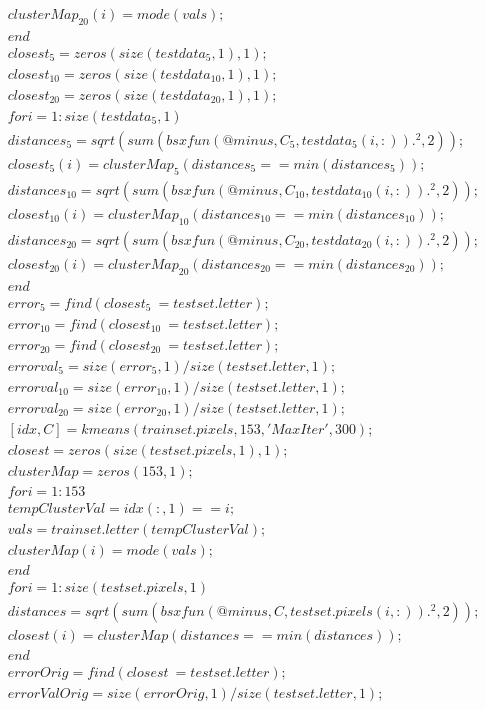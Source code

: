\begin{enumerate}
\begin{align*}
    clusterMap_{20}(i) = mode(vals);\\
end\\
closest_5 = zeros(size(testdata_5,1),1); \\
closest_{10} = zeros(size(testdata_{10},1),1); \\
closest_{20} = zeros(size(testdata_{20},1),1); \\
for i=1:size(testdata_5,1) \\
    distances_5 = sqrt(sum(bsxfun(@minus, C_5, testdata_5(i,:)).^2,2)); \\
    closest_5(i) = clusterMap_5(distances_5==min(distances_5)); \\
    distances_10 = sqrt(sum(bsxfun(@minus, C_10, testdata_10(i,:)).^2,2)); \\
    closest_10(i) = clusterMap_10(distances_10==min(distances_10)); \\
    distances_20 = sqrt(sum(bsxfun(@minus, C_20, testdata_20(i,:)).^2,2)); \\
    closest_20(i) = clusterMap_20(distances_20==min(distances_20)); \\
end \\
error_5 = find(closest_5 ~= testset.letter); \\
error_10 = find(closest_10 ~= testset.letter); \\
error_20 = find(closest_20 ~= testset.letter); \\
errorval_5 = size(error_5,1)/size(testset.letter,1); \\
errorval_10 = size(error_10,1)/size(testset.letter,1); \\
errorval_20 = size(error_20,1)/size(testset.letter,1); \\
[idx,C] = kmeans(trainset.pixels,153,'MaxIter',300); \\
closest = zeros(size(testset.pixels,1),1); \\
clusterMap = zeros(153,1); \\
for i=1:153 \\
    tempClusterVal = idx(:,1) ==i; \\
    vals = trainset.letter(tempClusterVal); \\
    clusterMap(i) = mode(vals); \\
end \\
for i=1:size(testset.pixels,1) \\
    distances = sqrt(sum(bsxfun(@minus, C, testset.pixels(i,:)).^2,2)); \\
    closest(i) = clusterMap(distances==min(distances)); \\
end \\
errorOrig = find(closest ~= testset.letter); \\
errorValOrig = size(errorOrig,1)/size(testset.letter,1); \\
\end{align*}


\end{enumerate}
